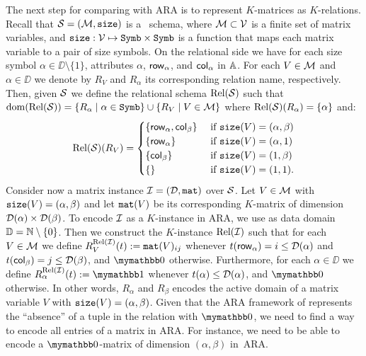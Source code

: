 The next step for comparing \langsum with ARA is to represent $K$-matrices as $K$-relations.
Recall that $\mathcal{S}=(\mathcal{M},\texttt{size})$ is a \lang\ schema, where $\mathcal{M}\subset \mathcal{V}$ is a finite set of matrix variables, and $\texttt{size}: \mathcal{V} \mapsto \texttt{Symb}\times \texttt{Symb}$ is a function that maps each matrix variable to a pair of size symbols. On the relational side
we have for each size symbol $\alpha\in\DD\setminus\{1\}$, attributes $\alpha$, $\mathsf{row}_\alpha$, and $\mathsf{col}_\alpha$ in $\mathbb{A}$. For each $V\in\mathcal{M}$ and $\alpha \in \DD$ we denote
by $R_V$ and $R_\alpha$ its corresponding relation name, respectively. Then, given $\mathcal{S}$ we define the relational schema $\text{Rel}(\mathcal{S})$ such that $\operatorname{dom}(\text{Rel}(\mathcal{S})) =  \{R_\alpha \mid \alpha\in\texttt{Symb}\} \cup \{R_V \mid V \in \mathcal{M}\}$ where $\text{Rel}(\mathcal{S})(R_\alpha) = \{\alpha\}$ and:
\[
\text{Rel}(\mathcal{S})(R_V) = \begin{cases}
\lbrace\mathsf{row}_\alpha,\mathsf{col}_\beta \rbrace & \text{ if $ \texttt{size}(V)=(\alpha,\beta)$} \\
\lbrace\mathsf{row}_\alpha \rbrace & \text{ if $ \texttt{size}(V)=(\alpha,1)$} \\
\lbrace\mathsf{col}_\beta \rbrace  &
\text{ if $ \texttt{size}(V)=(1,\beta)$} \\
\lbrace\rbrace & \text{ if $\texttt{size}(V)=(1,1)$}.
\end{cases}
\]
Consider now a matrix instance $\mathcal{I} = (\mathcal{D},\texttt{mat})$ over $\mathcal{S}$.
Let $V\in\mathcal{M}$ with $\texttt{size}(V)=(\alpha,\beta)$ and let $\texttt{mat}(V)$ be its corresponding $K$-matrix of dimension $\mathcal{D}(\alpha)\times \mathcal{D}(\beta)$.
To encode $\mathcal{I}$ as a $K$-instance in ARA, we use as data domain $\mathbb{D} = \mathbb{N} \setminus \{0\}$. Then we construct the $K$-instance $\text{Rel}(\mathcal{I})$ such that for each $V\in\mathcal{M}$ we define 
$R_V^{\text{Rel}(\mathcal{I})}(t):=\texttt{mat}(V)_{ij}$ whenever $t(\mathsf{row}_\alpha) = i \leq \mathcal{D}(\alpha)$ and $t(\mathsf{col}_\beta) = j \leq \mathcal{D}(\beta)$, and $\kzero$ otherwise. Furthermore, for each $\alpha \in \DD$ we define $R_\alpha^{\text{Rel}(\I)}(t):=\kone$ whenever $t(\alpha) \leq \mathcal{D}(\alpha)$, and $\kzero$ otherwise. In other words, $R_\alpha$ and $R_\beta$ encodes the active domain of a matrix variable $V$ with $\texttt{size}(V)=(\alpha,\beta)$. Given that the ARA framework of \cite{GreenKT07} represents the ``absence'' of a tuple in the relation with $\kzero$, we need to find a way to encode all entries of a matrix in ARA. For instance, we need to be able to encode a $\kzero$-matrix of dimension $(\alpha,\beta)$ in~ARA.

